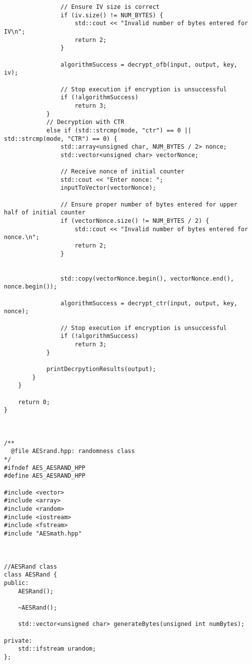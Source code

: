 \documentclass[a4paper,12pt]{article}
\begin{document}
{\begin{lstlisting}
                // Ensure IV size is correct
                if (iv.size() != NUM_BYTES) {
                    std::cout << "Invalid number of bytes entered for IV\n";
                    return 2;
                }

                algorithmSuccess = decrypt_ofb(input, output, key, iv);

                // Stop execution if encryption is unsuccessful
                if (!algorithmSuccess)
                    return 3;
            }
            // Decryption with CTR
            else if (std::strcmp(mode, "ctr") == 0 || std::strcmp(mode, "CTR") == 0) {
                std::array<unsigned char, NUM_BYTES / 2> nonce;
                std::vector<unsigned char> vectorNonce;

                // Receive nonce of initial counter
                std::cout << "Enter nonce: ";
                inputToVector(vectorNonce);

                // Ensure proper number of bytes entered for upper half of initial counter
                if (vectorNonce.size() != NUM_BYTES / 2) {
                    std::cout << "Invalid number of bytes entered for nonce.\n";
                    return 2;
                }


                std::copy(vectorNonce.begin(), vectorNonce.end(), nonce.begin());

                algorithmSuccess = decrypt_ctr(input, output, key, nonce);

                // Stop execution if encryption is unsuccessful
                if (!algorithmSuccess)
                    return 3;
            }

            printDecrpytionResults(output);
        }
    }

    return 0;
}



/**
  @file AESrand.hpp: randomness class
*/
#ifndef AES_AESRAND_HPP
#define AES_AESRAND_HPP

#include <vector>
#include <array>
#include <random>
#include <iostream>
#include <fstream>
#include "AESmath.hpp"



//AESRand class
class AESRand {
public:
    AESRand();

    ~AESRand();

    std::vector<unsigned char> generateBytes(unsigned int numBytes);

private:
    std::ifstream urandom;
};



\end{lstlisting}}
\end{document}
